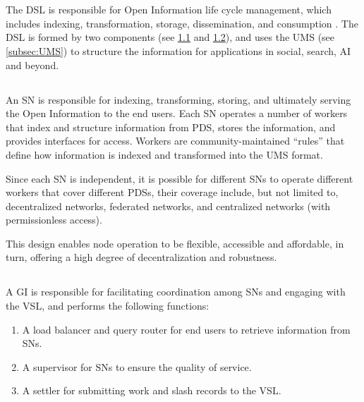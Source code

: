 \section{}
\label{sec:DSL}

The \gls{DSL} is responsible for Open Information life cycle management, which includes indexing, transformation, storage, dissemination, and consumption \cite{nationalinstituteofstandardsandtechnology2016Information}. The \gls{DSL} is formed by two components (see \cref{subsec:SN} and \cref{subsec:GI}), and uses the \gls{UMS} (see \cref{subsec:UMS}) to structure the information for applications in social, search, AI and beyond.

\subsection{}
\label{subsec:SN}

An \gls{SN} is responsible for indexing, transforming, storing, and ultimately serving the Open Information to the end users. Each \gls{SN} operates a number of workers that index and structure information from \gls{PDS}, stores the information, and provides interfaces for access. Workers are community-maintained ``rules'' that define how information is indexed and transformed into the \gls{UMS} format. 

Since each \gls{SN} is independent, it is possible for different \glspl{SN} to operate different workers that cover different \glspl{PDS}, their coverage include, but not limited to, decentralized networks, federated networks, and centralized networks (with permissionless access).

This design enables node operation to be flexible, accessible and affordable, in turn, offering a high degree of decentralization and robustness.

\subsection{}
\label{subsec:GI}

A \gls{GI} is responsible for facilitating coordination among \glspl{SN} and engaging with the \gls{VSL}, and performs the following functions:
\begin{enumerate}
    \item A load balancer and query router for end users to retrieve information from \glspl{SN}.
    \item A supervisor for \glspl{SN} to ensure the quality of service.
    \item A settler for submitting work and slash records to the \gls{VSL}.
\end{enumerate}

